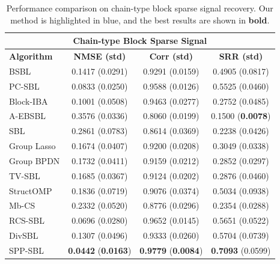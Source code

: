 \documentclass[lettersize,journal]{IEEEtran}
\theoremstyle{remark}
\begin{document}
\begin{table}[!t]
	\centering
	\caption{Performance comparison on chain-type block sparse signal recovery. Our method is highlighted in \colorbox{customblue}{blue}, and the best results are shown in \textbf{bold}.}
	\label{tab:blockIBA-data}
	\begin{tabularx}{\linewidth}{lccc}
		\toprule
		\multicolumn{4}{c}{\textbf{Chain-type Block Sparse Signal}}\\
		\midrule
		\textbf{Algorithm} & \textbf{NMSE (std)} & \textbf{Corr (std)} & \textbf{SRR (std)} \\
		\midrule
		BSBL         & 0.1417 (0.0291) & 0.9291 (0.0159) &  0.4905 (0.0817)  \\
		PC-SBL       & 0.0833 (0.0250) & 0.9588 (0.0126) &  0.5525 (0.0460)  \\
		Block-IBA    & 0.1001 (0.0508) & 0.9463 (0.0277) &  0.2752 (0.0485) \\
		A-EBSBL      & 0.3576 (0.0336) & 0.8060 (0.0199) &  0.1500 (\textbf{0.0078})  \\
		SBL          & 0.2861 (0.0783) & 0.8614 (0.0369) &  0.2238 (0.0426)  \\
		Group Lasso  & 0.1674 (0.0407) & 0.9200 (0.0208) &  0.3049 (0.0338)  \\
		Group BPDN   & 0.1732 (0.0411) & 0.9159 (0.0212) &  0.2852 (0.0297)  \\
		TV-SBL    & 0.1685 (0.0367) & 0.9124 (0.0202) &  0.2876 (0.0460)  \\
		StructOMP    & 0.1836 (0.0719) & 0.9076 (0.0374) &  0.5034 (0.0938)  \\
		Mb-CS  &  0.2332 (0.0520) & 0.8776 (0.0296) & 0.2354 (0.0288)\\
		RCS-SBL  &  0.0696 (0.0280) & 0.9652 (0.0145) & 0.5651 (0.0522)\\
		DivSBL       & 0.1307 (0.0496) & 0.9333 (0.0260) &  0.5704 (0.0739)  \\
		\rowcolor{customblue}
		SPP-SBL      & \textbf{0.0442} (\textbf{0.0163}) & \textbf{0.9779} (\textbf{0.0084}) & \textbf{0.7093} (0.0599)  \\
		\bottomrule
	\end{tabularx}
\end{table}
\end{document}
